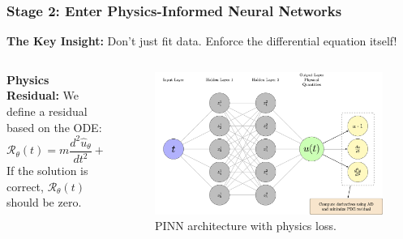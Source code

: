 \documentclass[notes]{beamer}
\begin{document}
\begin{frame}
\frametitle{Stage 2: Enter Physics-Informed Neural Networks}

\textbf{The Key Insight:} Don't just fit data. Enforce the differential equation itself!

\begin{columns}[T]
    \begin{column}{0.5\textwidth}
        \textbf{Physics Residual:}
        We define a residual based on the ODE:
        \begin{equation*}
        \mathcal{R}_\theta(t) = m\frac{d^2\hat{u}_\theta}{dt^2} + c\frac{d\hat{u}_\theta}{dt} + k\hat{u}_\theta
        \end{equation*}
        If the solution is correct, $\mathcal{R}_\theta(t)$ should be zero.
    \end{column}
    \begin{column}{0.5\textwidth}
        \begin{figure}[ht]
            \centering
            \includegraphics[width=\linewidth]{figs/oscillator-pinn-nn.png}
            \caption*{PINN architecture with physics loss.}
        \end{figure}
    \end{column}
\end{columns}

\end{frame}
\end{document}
